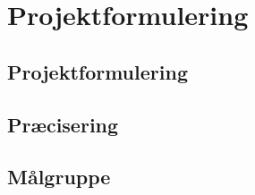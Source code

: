 \chapter{Projektformulering}\label{kapitel_Projektformulering}

\section{Projektformulering}


\section{Præcisering}


\section{Målgruppe}

 
